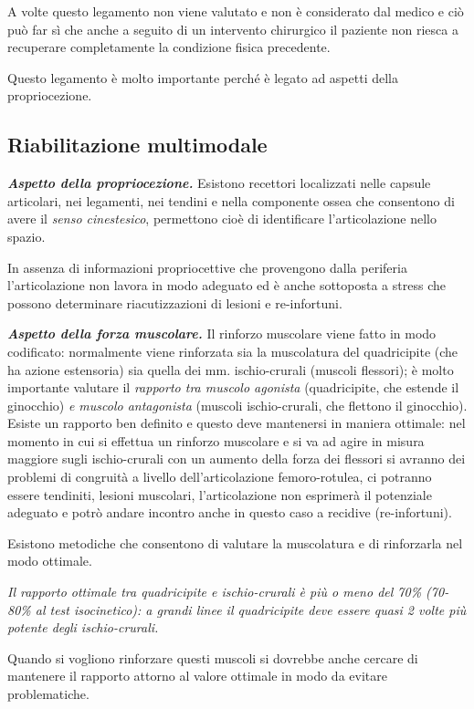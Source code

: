 A volte questo legamento non viene valutato e non è considerato dal
medico e ciò può far sì che anche a seguito di un intervento chirurgico
il paziente non riesca a recuperare completamente la condizione fisica
precedente.

Questo legamento è molto importante perché è legato ad aspetti della
propriocezione.

\subsection{Riabilitazione multimodale}


\emph{\textbf{Aspetto della propriocezione.}} Esistono recettori
localizzati nelle capsule articolari, nei legamenti, nei tendini e nella
componente ossea che consentono di avere il \emph{senso cinestesico},
permettono cioè di identificare l'articolazione nello spazio.

In assenza di informazioni propriocettive che provengono dalla periferia
l'articolazione non lavora in modo adeguato ed è anche sottoposta a
stress che possono determinare riacutizzazioni di lesioni e
re-infortuni.

\emph{\textbf{Aspetto della forza muscolare.}} Il rinforzo muscolare
viene fatto in modo codificato: normalmente viene rinforzata sia la
muscolatura del quadricipite (che ha azione estensoria) sia quella dei
mm. ischio-crurali (muscoli flessori); è molto importante valutare il
\emph{rapporto tra muscolo agonista} (quadricipite, che estende il
ginocchio) \emph{e muscolo antagonista} (muscoli ischio-crurali, che
flettono il ginocchio). Esiste un rapporto ben definito e questo deve
mantenersi in maniera ottimale: nel momento in cui si effettua un
rinforzo muscolare e si va ad agire in misura maggiore sugli
ischio-crurali con un aumento della forza dei flessori si avranno dei
problemi di congruità a livello dell'articolazione femoro-rotulea, ci
potranno essere tendiniti, lesioni muscolari, l'articolazione non
esprimerà il potenziale adeguato e potrò andare incontro anche in questo
caso a recidive (re-infortuni).

Esistono metodiche che consentono di valutare la muscolatura e di
rinforzarla nel modo ottimale.

\emph{Il rapporto ottimale tra quadricipite e ischio-crurali è più o
meno del 70\% (70-80\% al test isocinetico): a grandi linee il
quadricipite deve essere quasi 2 volte più potente degli ischio-crurali.
}

Quando si vogliono rinforzare questi muscoli si dovrebbe anche cercare
di mantenere il rapporto attorno al valore ottimale in modo da evitare
problematiche.

